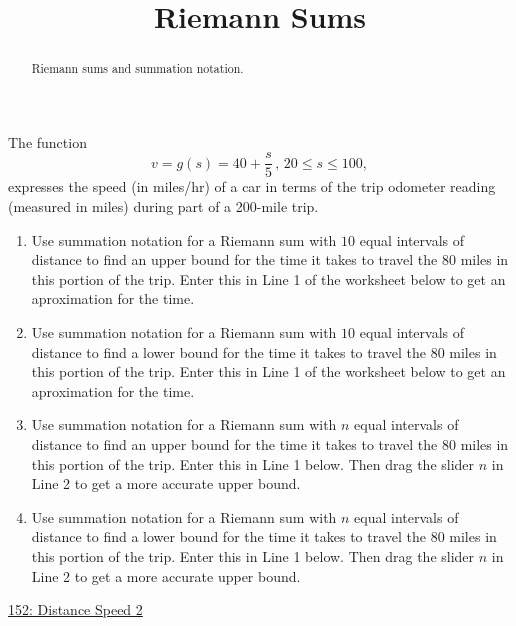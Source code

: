 \documentclass{ximera}
\title{Riemann Sums}
\begin{document}
\begin{abstract}
Riemann sums and summation notation.
\end{abstract}
\maketitle


\begin{question} \label{QPdfer34334}
The function
\[
   v = g(s) = 40 + \frac{s}{5} \, , \, 20\leq s \leq 100 ,
\]
expresses the speed (in miles/hr) of a car in terms of the trip odometer reading (measured in miles) during part of a 200-mile trip.

\begin{enumerate}
\item Use summation notation for a Riemann sum with $10$ equal intervals of distance to find an upper bound for the time it takes to travel the $80$ miles in this portion of the trip. Enter this in Line 1 of the worksheet below to get an  aproximation for the time.

\item Use summation notation for a Riemann sum with $10$ equal intervals of distance to find a lower bound for the time it takes to travel the $80$ miles in this portion of the trip. Enter this in Line 1 of the worksheet below to get an  aproximation for the time.

\item Use summation notation for a Riemann sum with $n$ equal intervals of distance to find an upper bound for the time it takes to travel the $80$ miles in this portion of the trip. Enter this in Line 1 below. Then drag the slider $n$ in Line 2 to get a more accurate upper bound.

\item Use summation notation for a Riemann sum with $n$ equal intervals of distance to find a lower bound for the time it takes to travel the $80$ miles in this portion of the trip. Enter this in Line 1 below. Then drag the slider $n$ in Line 2 to get a more accurate upper bound.


\end{enumerate}

\begin{onlineOnly}
    \begin{center}
\end{center}
\end{onlineOnly}
 
\href{https://www.desmos.com/calculator/k10phbukon}{152: Distance Speed 2}


\end{question}



 
\begin{onlineOnly}
    \begin{center}
\end{center}
\end{onlineOnly}
\end{document}
